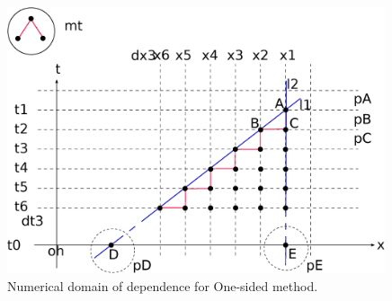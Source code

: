 \begin{figure}[ht]
	\includegraphics[width=0.99\textwidth]{DomainOfDependenceLF.eps}
	\caption{Numerical domain of dependence for One-sided method.}
	\label{\LABEL}
\end{figure}
